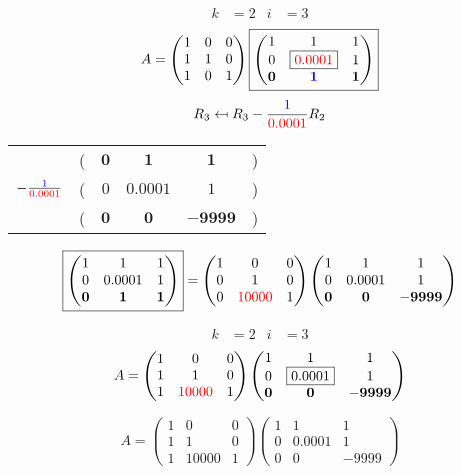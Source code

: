 \documentclass[pdf]{beamer}
\begin{document}
\begin{frame}{}\begin{align*} k &= 2 & i &= 3 \end{align*} $$A=\begin{pmatrix}1&0&0\\1&1&0\\1&0&1\end{pmatrix} \boxed{\begin{pmatrix}1&1&1\\0&\boxed{{\color{red}0.0001}}&1\\\mathbf{0}&\mathbf{{\color{blue}1}}&\mathbf{1}\end{pmatrix}} $$ $$R_3 \mapsfrom R_3 - \frac{{\color{blue}1}}{{\color{red}0.0001}} R_2$$ \begin{center}\begin{tabular}{cccccc}  &(& $ \mathbf{0} $ & $ \mathbf{1} $ & $ \mathbf{1} $ &)\\$ -\frac{{\color{blue}1}}{{\color{red}0.0001}} $&(& $ 0 $ & $ 0.0001 $ & $ 1 $ &)\\\hline  &(& $ \mathbf{0} $ & $ \mathbf{0} $ & $ \mathbf{-9999} $ &) \end{tabular}\end{center} $$ \boxed{\begin{pmatrix}1&1&1\\0&0.0001&1\\\mathbf{0}&\mathbf{1}&\mathbf{1}\end{pmatrix}} = \begin{pmatrix}1&0&0\\0&1&0\\0&{\color{red}10000}&1\end{pmatrix} \begin{pmatrix}1&1&1\\0&0.0001&1\\\mathbf{0}&\mathbf{0}&\mathbf{-9999}\end{pmatrix} $$\end{frame}
\begin{frame}{}\begin{align*} k &= 2 & i &= 3 \end{align*}$$A=\begin{pmatrix}1&0&0\\1&1&0\\1&{\color{red}10000}&1\end{pmatrix} \begin{pmatrix}1&1&1\\0&\boxed{0.0001}&1\\\mathbf{0}&\mathbf{0}&\mathbf{-9999}\end{pmatrix} $$\end{frame}
\begin{frame}{}$$A=\begin{pmatrix}1&0&0\\1&1&0\\1&10000&1\end{pmatrix} \begin{pmatrix}1&1&1\\0&0.0001&1\\0&0&-9999\end{pmatrix}$$
\end{frame}
\end{document}
